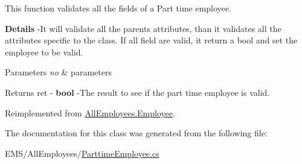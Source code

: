 This function validates all the fields of a Part time employee. 

{\bfseries Details} -\/\-It will validate all the parents attributes, than it validates all the attributes specific to the class. If all field are valid, it return a bool and set the employee to be valid.


\begin{DoxyParams}{Parameters}
{\em no} & parameters \\
\hline
\end{DoxyParams}
\begin{DoxyReturn}{Returns}
ret -\/ {\bfseries bool} -\/\-The result to see if the part time employee is valid. 
\end{DoxyReturn}


Reimplemented from \hyperlink{class_all_employees_1_1_employee_ad40f5a6a835b161d5d7474b89e353dea}{All\-Employees.\-Employee}.



The documentation for this class was generated from the following file\-:\begin{DoxyCompactItemize}
\item 
E\-M\-S/\-All\-Employees/\hyperlink{_parttime_employee_8cs}{Parttime\-Employee.\-cs}\end{DoxyCompactItemize}
